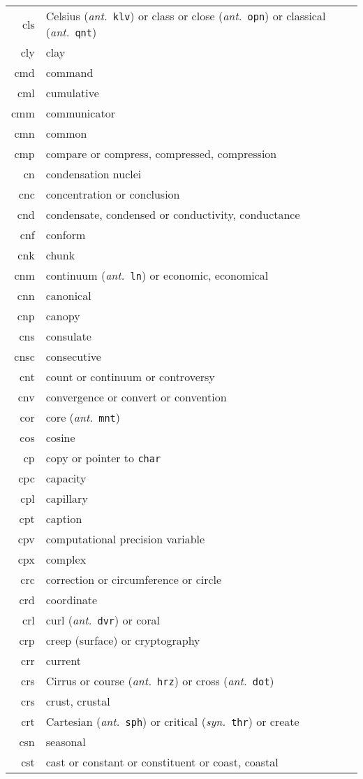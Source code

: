 \documentclass[12pt,twoside]{article}
\newcommand{\ant}[1]{(\textit{ant.}~\texttt{#1})}
\newcommand{\syn}[1]{(\textit{syn.}~\texttt{#1})}
\begin{document}
\begin{longtable}[>{\bfseries}l]{>{\ttfamily}r l}
cls & Celsius \ant{klv} or class or close \ant{opn} or classical \ant{qnt} \\
cly & clay \\
cmd & command \\
cml & cumulative \\
cmm & communicator \\
cmn & common \\
cmp & compare or compress, compressed, compression \\
cn & condensation nuclei \\
cnc & concentration or conclusion \\
cnd & condensate, condensed or conductivity, conductance \\
cnf & conform \\
cnk & chunk \\
cnm & continuum \ant{ln} or economic, economical \\
cnn & canonical \\
cnp & canopy \\
cns & consulate \\
cnsc & consecutive \\
cnt & count or continuum or controversy \\
cnv & convergence or convert or convention \\
cor & core \ant{mnt} \\
cos & cosine \\
cp & copy or pointer to \texttt{char} \\
cpc & capacity \\
cpl & capillary \\
cpt & caption \\
cpv & computational precision variable \\
cpx & complex \\
crc & correction or circumference or circle \\
crd & coordinate \\
crl & curl \ant{dvr} or coral \\
crp & creep (surface) or cryptography \\
crr & current \\
crs & Cirrus or course \ant{hrz} or cross \ant{dot} \\
crs & crust, crustal \\
crt & Cartesian \ant{sph} or critical \syn{thr} or create \\
csn & seasonal \\
cst & cast or constant or constituent or coast, coastal \\

\end{longtable}
\end{document}
